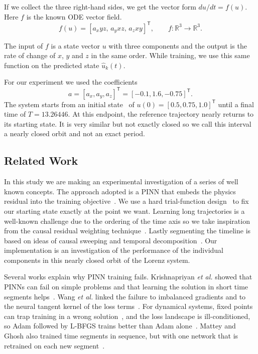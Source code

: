 \documentclass[conference,a4paper]{IEEEtran}
\begin{document}
If we collect the three right-hand sides, we get the vector form $du/dt=f(u)$. Here $f$ is the known ODE vector field.
\[
f(u)=[a_x yz,\,a_y xz,\,a_z xy]^\mathsf{T},\qquad f:\mathbb{R}^{3}\to\mathbb{R}^{3}.
\]

The input of $f$ is a state vector $u$ with three components and the output is the rate of change of $x$, $y$ and $z$ in the same order. While training, we use this same function on the predicted state $\hat{u}_k(t)$.

For our experiment we used the coefficients
\[
a=[a_x,a_y,a_z]^\mathsf{T}=[-0.1,1.6,-0.75]^\mathsf{T}.
\]
 The system starts from an initial state~\cite{matthews2024pinnde} of $u(0)=[0.5,0.75,1.0]^\mathsf{T}$ until a final time of $T=13.26446$. At this endpoint, the reference trajectory nearly returns to its starting state. It is very similar but not exactly closed so we call this interval a nearly closed orbit and not an exact period.


\subsection{Related Work}
In this study we are making an experimental investigation of a series of well known concepts. The approach adopted is a PINN that embeds the physics residual into the training objective~\cite{raissi2019}. We use a hard trial-function design~\cite{lagaris1998} to fix our starting state exactly at the point we want. Learning long trajectories is a well-known challenge due to the ordering of the time axis so we take inspiration from the causal residual weighting technique~\cite{wang2024causal}. Lastly segmenting the timeline is based on ideas of causal sweeping and temporal decomposition~\cite{penwarden2023}. Our implementation is an investigation of the performance of the individual components in this nearly closed orbit of the Lorenz system.

Several works explain why PINN training fails. Krishnapriyan \emph{et al.} showed that PINNs can fail on simple problems and that learning the solution in short time segments helps~\cite{krishnapriyan2021}. Wang \emph{et al.} linked the failure to imbalanced gradients and to the neural tangent kernel of the loss terms~\cite{wang2021gradient,wang2022ntk}. For dynamical systems, fixed points can trap training in a wrong solution~\cite{rohrhofer2023}, and the loss landscape is ill-conditioned, so Adam followed by L-BFGS trains better than Adam alone~\cite{rathore2024}. Mattey and Ghosh also trained time segments in sequence, but with one network that is retrained on each new segment~\cite{mattey2022bcpinn}.
\end{document}
